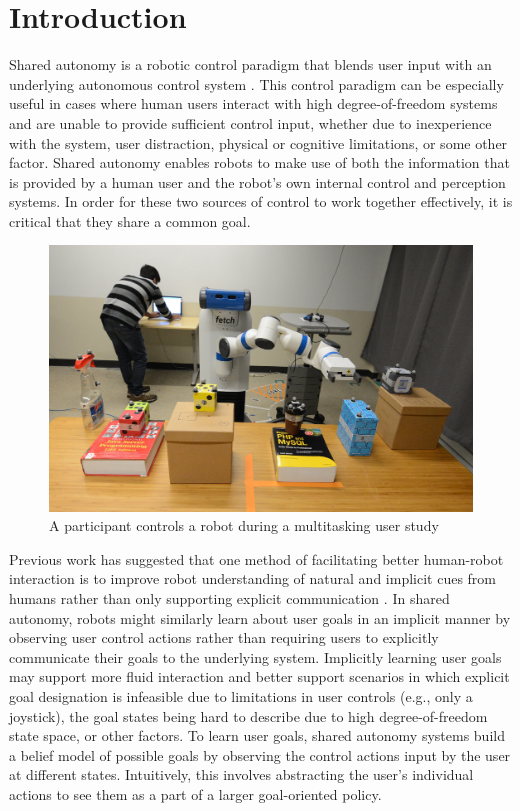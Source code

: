 \documentclass[conference]{IEEEtran}
\begin{document}
\section{Introduction}

Shared autonomy is a robotic control paradigm that blends user input with an underlying autonomous control system \cite{dragan2012formalizing, dragan2013policy, gopinath2017human}. This control paradigm can be especially useful in cases where human users interact with high degree-of-freedom systems and are unable to provide sufficient control input, whether due to inexperience with the system, user distraction, physical or cognitive limitations, or some other factor. Shared autonomy enables robots to make use of both the information that is provided by a human user and the robot's own internal control and perception systems. In order for these two sources of control to work together effectively, it is critical that they share a common goal.

\begin{figure}
\includegraphics[width=\columnwidth]{figures/teaser-v2.jpg}
\caption{A participant controls a robot during a multitasking user study}
\label{teaser}
\end{figure}

Previous work has suggested that one method of facilitating better human-robot interaction is to improve robot understanding of natural and implicit cues from humans rather than only supporting explicit communication \cite{goodrich2003seven}. In shared autonomy, robots might similarly learn about user goals in an implicit manner by observing user control actions rather than requiring users to explicitly communicate their goals to the underlying system. Implicitly learning user goals may support more fluid interaction and better support scenarios in which explicit goal designation is infeasible due to limitations in user controls (e.g., only a joystick), the goal states being hard to describe due to high degree-of-freedom state space, or other factors. To learn user goals, shared autonomy systems build a belief model of possible goals by observing the control actions input by the user at different states. Intuitively, this involves abstracting the user's individual actions to see them as a part of a larger goal-oriented policy.
\end{document}

